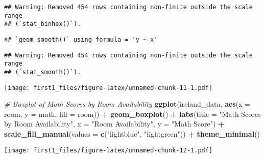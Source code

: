 \documentclass[
]{article}
\newenvironment{Shaded}{\begin{snugshade}}{\end{snugshade}}
\newcommand{\AttributeTok}[1]{\textcolor[rgb]{0.13,0.29,0.53}{#1}}
\newcommand{\CommentTok}[1]{\textcolor[rgb]{0.56,0.35,0.01}{\textit{#1}}}
\newcommand{\FunctionTok}[1]{\textcolor[rgb]{0.13,0.29,0.53}{\textbf{#1}}}
\newcommand{\NormalTok}[1]{#1}
\newcommand{\SpecialCharTok}[1]{\textcolor[rgb]{0.81,0.36,0.00}{\textbf{#1}}}
\newcommand{\StringTok}[1]{\textcolor[rgb]{0.31,0.60,0.02}{#1}}
\begin{document}
\begin{verbatim}
## Warning: Removed 454 rows containing non-finite outside the scale range
## (`stat_binhex()`).
\end{verbatim}

\begin{verbatim}
## `geom_smooth()` using formula = 'y ~ x'
\end{verbatim}

\begin{verbatim}
## Warning: Removed 454 rows containing non-finite outside the scale range
## (`stat_smooth()`).
\end{verbatim}

\texttt{[image: first1\_files/figure-latex/unnamed-chunk-11-1.pdf]}

\begin{Shaded}
\begin{Highlighting}[]
\CommentTok{\# Boxplot of Math Scores by Room Availability}
\FunctionTok{ggplot}\NormalTok{(ireland\_data, }\FunctionTok{aes}\NormalTok{(}\AttributeTok{x =}\NormalTok{ room, }\AttributeTok{y =}\NormalTok{ math, }\AttributeTok{fill =}\NormalTok{ room)) }\SpecialCharTok{+}
  \FunctionTok{geom\_boxplot}\NormalTok{() }\SpecialCharTok{+}
  \FunctionTok{labs}\NormalTok{(}\AttributeTok{title =} \StringTok{"Math Scores by Room Availability"}\NormalTok{, }\AttributeTok{x =} \StringTok{"Room Availability"}\NormalTok{, }\AttributeTok{y =} \StringTok{"Math Score"}\NormalTok{) }\SpecialCharTok{+}
  \FunctionTok{scale\_fill\_manual}\NormalTok{(}\AttributeTok{values =} \FunctionTok{c}\NormalTok{(}\StringTok{"lightblue"}\NormalTok{, }\StringTok{"lightgreen"}\NormalTok{)) }\SpecialCharTok{+}
  \FunctionTok{theme\_minimal}\NormalTok{()}
\end{Highlighting}
\end{Shaded}

\texttt{[image: first1\_files/figure-latex/unnamed-chunk-12-1.pdf]}
\end{document}
